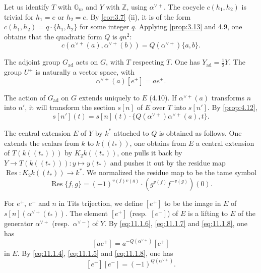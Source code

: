 \documentclass[11pt,a4paper]{article}
\theoremstyle{plain}
\theoremstyle{definition}
\DeclareMathOperator{\Res}{Res}
\newcommand{\bZ}{\mathbb{Z}}
\newcommand{\Gm}{{\mathbb{G}_m}}
\newcommand{\ad}{\mathrm{ad}}
\begin{document}
Let us identify $T$ with $\Gm$ and $Y$ with $\bZ$, using $\alpha^{\vee+}$. The cocycle $c(h_1, h_2)$ is trivial for $h_1 = e$ or $h_2 = e$. By \ref{cor:3.7} (ii), it is of the form $c(h_1, h_2) = q \cdot \{h_1, h_2\}$ for some integer $q$. Applying \ref{prop:3.13} and 4.9, one obtains that the quadratic form $Q$ is $qn^2$:
\begin{equation}\label{eq:11.1.5}
c(\alpha^{\vee+}(a), \alpha^{\vee+}(b)) = Q(\alpha^{\vee+}) \{a, b\}.
\end{equation}

The adjoint group $G_\ad$ acts on $G$, with $T$ respecting $T$. One has $Y_\ad = \frac{1}{2}Y$. The group $U^+$ is naturally a vector space, with
\begin{equation}\label{eq:11.1.6}
\alpha^{\vee+}(a)[e^+] = a e^+.
\end{equation}

The action of $G_\ad$ on $G$ extends uniquely to $E$ (4.10). If $\alpha^{\vee+}(a)$ transforms $n$ into $n'$, it will transform the section $s[n]$ of $E$ over $T$ into $s[n']$. By \ref{prop:4.12},
\begin{equation}\label{eq:11.1.7}
s[n'](t) = s[n](t) \cdot \{Q(\alpha^{\vee+}) \alpha^{\vee+}(a), t\}.
\end{equation}

The central extension $E$ of $Y$ by $k^*$ attached to $Q$ is obtained as follows. One extends the scalars from $k$ to $k((t_*))$, one obtains from $E$ a central extension of $T(k((t_*)))$ by $K_2k((t_*))$, one pulls it back by $Y \to T(k((t_*))): y \mapsto y(t_*)$ and pushes it out by the residue map $\Res: K_2 k((t_*)) \to k^*$. We normalized the residue map to be the tame symbol
\begin{equation}\label{eq:11.1.8}
\Res\{f, g\} = (-1)^{v(f)v(g)} \cdot (g^{v(f)} f^{-v(g)})(0).
\end{equation}

For $e^+$, $e^-$ and $n$ in Tits trijection, we define $[e^+]$ to be the image in $E$ of $s[n](\alpha^{\vee+}(t_*))$. The element $[e^+]$ (resp.~$[e^-]$) of $E$ is a lifting to $E$ of the generator $\alpha^{\vee+}$ (resp.~$\alpha^{\vee-}$) of $Y$. By \eqref{eq:11.1.6}, \eqref{eq:11.1.7} and \eqref{eq:11.1.8}, one has
\begin{equation}\label{eq:11.1.9}
[ae^+] = a^{-Q(\alpha^{\vee+})} [e^+]
\end{equation}
in $E$. By \eqref{eq:11.1.4}, \eqref{eq:11.1.5} and \eqref{eq:11.1.8}, one has
\begin{equation}\label{eq:11.1.10}
[e^+][e^-] = (-1)^{Q(\alpha^{\vee+})}.
\end{equation}
\end{document}
